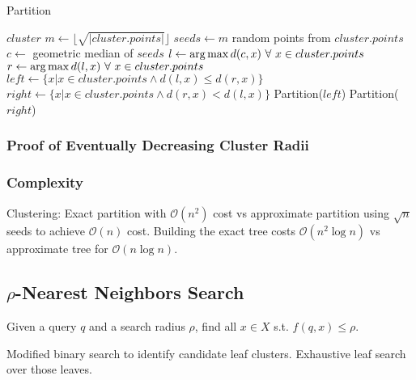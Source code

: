 \begin{algorithm} %
\caption{Partition} %
\label{alg:partition} %
\begin{algorithmic}[1] %
    \REQUIRE $cluster$
    \STATE $m \leftarrow \lfloor \sqrt{|cluster.points|} \rfloor$
    \STATE $seeds \leftarrow m$ random points from $cluster.points$
    \STATE $c \leftarrow$ geometric median of $seeds$
    \STATE $l \leftarrow \operatorname*{arg\,max} d(c,x) \ \forall \ x \in cluster.points$
    \STATE $r \leftarrow \operatorname*{arg\,max} d(l,x) \ \forall \ x \in cluster.points$
    \STATE $left \leftarrow \{x | x \in cluster.points \land d(l,x) \le d(r,x)\}$
    \STATE $right \leftarrow \{x | x \in cluster.points \land d(r,x) < d(l,x)\}$
        \STATE Partition($left$)
    \ENDIF
        \STATE Partition($right$)
    \ENDIF
\end{algorithmic}
\end{algorithm}

\subsubsection {Proof of Eventually Decreasing Cluster Radii}
\label{subsubsec:methods:clustering:proof-of-eventually-decreasing-cluster-radii}

\subsubsection {Complexity}
\label{subsubsec:methods:clustering:complexity}

Clustering: Exact partition with $\mathcal{O}(n^2)$ cost vs approximate partition using $\sqrt{n}$ seeds to achieve $\mathcal{O}(n)$ cost.
Building the exact tree costs $\mathcal{O}(n^2 \log n)$ vs approximate tree for $\mathcal{O}(n \log n)$.

\subsection{\texorpdfstring{$\rho$}{p}-Nearest Neighbors Search}
\label{subsec:methods:rnn-search}

Given a query $q$ and a search radius $\rho$, find all $x \in X$ s.t. $f(q, x) \leq \rho$.

Modified binary search to identify candidate leaf clusters.
Exhaustive leaf search over those leaves.

